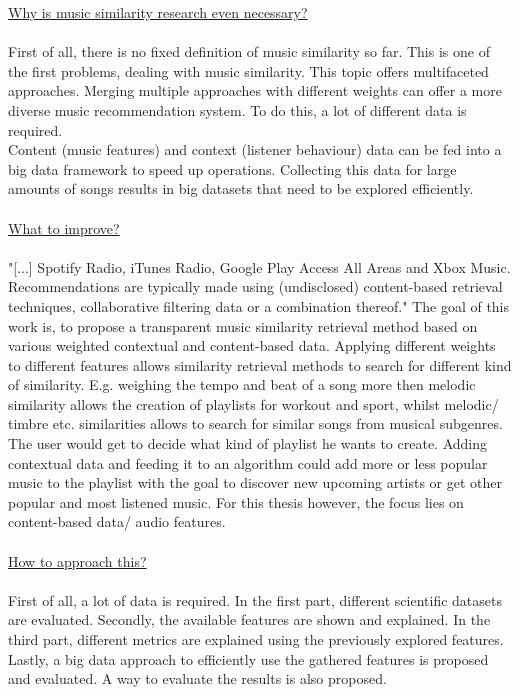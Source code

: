 \underline{Why is music similarity research even necessary?} 
\ \\
\ \\
First of all, there is no fixed definition of music similarity so far. This is one of the first problems, dealing with music similarity. This topic offers multifaceted approaches. Merging multiple approaches with different weights can offer a more diverse music recommendation system. To do this, a lot of different data is required.\\
Content (music features) and context (listener behaviour) data can be fed into a big data framework to speed up operations.
Collecting this data for large amounts of songs results in big datasets that need to be explored efficiently.\\
\ \\
\underline{What to improve?}
\ \\
\ \\
"[...] Spotify Radio, iTunes Radio, Google Play Access All Areas and Xbox Music. Recommendations are typically made using (undisclosed) content-based retrieval techniques, collaborative filtering data or a combination thereof." \cite[p. 9]{knees1}
The goal of this work is, to propose a transparent music similarity retrieval method based on various weighted contextual and content-based data. 
Applying different weights to different features allows similarity retrieval methods to search for different kind of similarity. 
E.g. weighing the tempo and beat of a song more then melodic similarity allows the creation of playlists for workout and sport, whilst melodic/ timbre etc. similarities allows to search for similar songs from musical subgenres. 
The user would get to decide what kind of playlist he wants to create. 
Adding contextual data and feeding it to an algorithm could add more or less popular music to the playlist with the goal to discover new upcoming artists or get other popular and most listened music. 
For this thesis however, the focus lies on content-based data/ audio features.\\ 
\ \\
\underline{How to approach this?}
\ \\
\ \\
First of all, a lot of data is required. In the first part, different scientific datasets are evaluated. 
Secondly, the available features are shown and explained. 
In the third part, different metrics are explained using the previously explored features. 
Lastly, a big data approach to efficiently use the gathered features is proposed and evaluated. A way to evaluate the results is also proposed.

